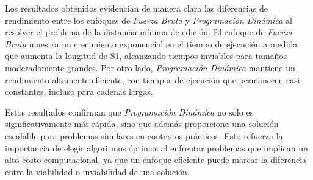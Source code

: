 Los resultados obtenidos evidencian de manera clara las diferencias de rendimiento entre los enfoques de \textit{Fuerza Bruta} y \textit{Programación Dinámica} al resolver el problema de la distancia mínima de edición. El enfoque de \textit{Fuerza Bruta} muestra un crecimiento exponencial en el tiempo de ejecución a medida que aumenta la longitud de S1, alcanzando tiempos inviables para tamaños moderadamente grandes. Por otro lado, \textit{Programación Dinámica} mantiene un rendimiento altamente eficiente, con tiempos de ejecución que permanecen casi constantes, incluso para cadenas largas.

Estos resultados confirman que \textit{Programación Dinámica} no solo es significativamente más rápida, sino que además proporciona una solución escalable para problemas similares en contextos prácticos. Esto refuerza la importancia de elegir algoritmos óptimos al enfrentar problemas que implican un alto costo computacional, ya que un enfoque eficiente puede marcar la diferencia entre la viabilidad o inviabilidad de una solución.
